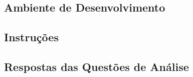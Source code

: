 \subsection{Ambiente de Desenvolvimento}
	

\subsection{Instruções}
	

\subsection{Respostas das Questões de Análise}
	
